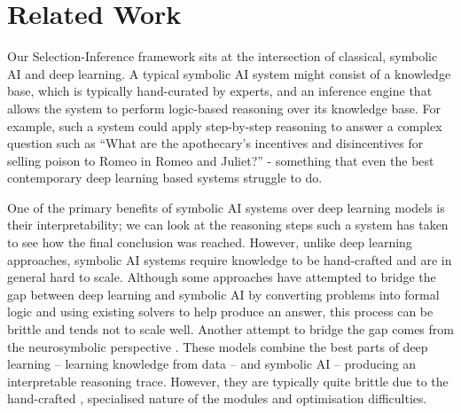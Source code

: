 \section{Related Work} Our Selection-Inference framework sits at the intersection of classical, symbolic AI and deep learning. A typical symbolic AI system might consist of a knowledge base, which is typically hand-curated by experts, and an inference engine that allows the system to perform logic-based reasoning over its knowledge base. For example, such a system could apply step-by-step reasoning to answer a complex question such as ``What are the apothecary's incentives and disincentives for selling poison to Romeo in Romeo and Juliet?'' \citep{lenat_2019} - something that even the best contemporary deep learning based systems struggle to do.

One of the primary benefits of symbolic AI systems over deep learning models is their interpretability; we can look at the reasoning steps such a system has taken to see how the final conclusion was reached. However, unlike deep learning approaches, symbolic AI systems require knowledge to be hand-crafted and are in general hard to scale. Although some approaches have attempted to bridge the gap between deep learning and symbolic AI by converting problems into formal logic \citep{nye2021improving} and using existing solvers to help produce an answer, this process can be brittle and tends not to scale well. Another attempt to bridge the gap comes from the neurosymbolic perspective \citep{mao2019neuro, yi2018neural, gupta2019nmn, hudson2019learning}. These models combine the best parts of deep learning -- learning knowledge from data -- and symbolic AI -- producing an interpretable reasoning trace. However, they are typically quite brittle due to the hand-crafted \citep{gupta2019nmn}, specialised nature \citep{mao2019neuro} of the modules and optimisation difficulties.


